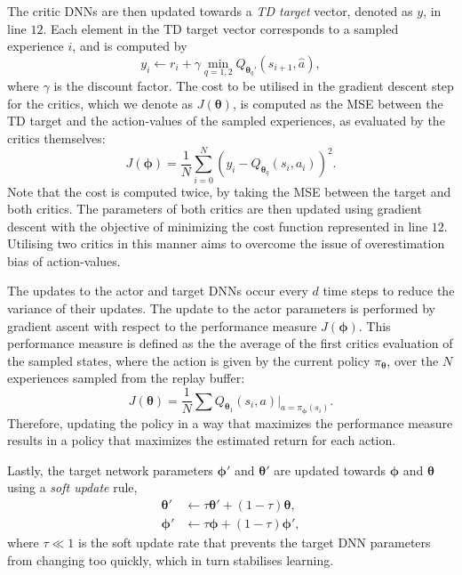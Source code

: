The critic DNNs are then updated towards a \emph{TD target} vector, denoted as $y$, in line $12$.
Each element in the TD target vector corresponds to a sampled experience $i$, and is computed by
\begin{equation}
    y_i \leftarrow r_i + \gamma \min_{q=1,2} Q_{\bm{\theta}_q'}(s_{i+1}, \hat{a}),
\end{equation}
where $\gamma$ is the discount factor. The cost to be utilised in the gradient descent step for the critics, which we denote as $J(\bm{\theta})$, is computed as the MSE between the TD target and the action-values of the sampled experiences, as evaluated by the critics themselves:
\begin{equation}
     J(\bm{\phi}) = \frac{1}{N} \sum_{i=0}^{N} (y_i - Q_{\bm{\theta}_q}(s_i,a_i))^{2}.
\end{equation}
Note that the cost is computed twice, by taking the MSE between the target and both critics.
The parameters of both critics are then updated using gradient descent with the objective of minimizing the cost function represented in line $12$.
Utilising two critics in this manner aims to overcome the issue of overestimation bias of action-values.


The updates to the actor and target DNNs occur every $d$ time steps to reduce the variance of their updates. 
The update to the actor parameters is performed by gradient ascent with respect to the performance measure $J(\bm{\phi})$.
This performance measure is defined as the the average of the first critics evaluation of the sampled states, where the action is given by the current policy $\pi_{\bm{\theta}}$, over the $N$ experiences sampled from the replay buffer:
\begin{equation}
    J(\bm{\theta}) = \frac{1}{N} \sum Q_{\bm{\theta}_1}(s_i,a) | _{a=\pi_{\bm{\phi}}(s_i)}.
\end{equation}
Therefore, updating the policy in a way that maximizes the performance measure results in a policy that maximizes the estimated return for each action.


Lastly, the target network parameters $\bm{\phi}'$ and $\bm{\theta}'$ are updated towards $\bm{\phi}$ and $\bm{\theta}$ using a \emph{soft update} rule, 
\begin{equation}
\begin{split}
    \bm{\theta}' &\leftarrow \tau \bm{\theta}' + (1 - \tau) \bm{\theta}, \\
    \bm{\phi}' &\leftarrow \tau \bm{\phi} + (1 - \tau) \bm{\phi}',
\end{split}
\end{equation}
where $\tau \ll 1$ is the soft update rate that prevents the target DNN parameters from changing too quickly, which in turn stabilises learning. 



